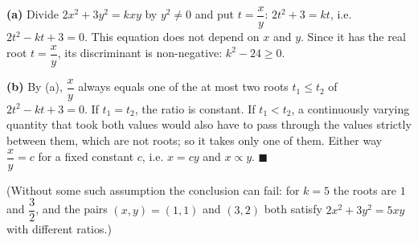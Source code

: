 \textbf{(a)} Divide $2x^2+3y^2=kxy$ by $y^2\ne0$ and put $t=\dfrac xy$: $2t^2+3=kt$, i.e. $2t^2-kt+3=0$. This equation does not depend on $x$ and $y$. Since it has the real root $t=\dfrac xy$, its discriminant is non-negative: $k^2-24\ge0$.

\textbf{(b)} By (a), $\dfrac xy$ always equals one of the at most two roots $t_1\le t_2$ of $2t^2-kt+3=0$. If $t_1=t_2$, the ratio is constant. If $t_1<t_2$, a continuously varying quantity that took both values would also have to pass through the values strictly between them, which are not roots; so it takes only one of them. Either way $\dfrac xy=c$ for a fixed constant $c$, i.e. $x=cy$ and $x\propto y$. $\blacksquare$

(Without some such assumption the conclusion can fail: for $k=5$ the roots are $1$ and $\dfrac32$, and the pairs $(x,y)=(1,1)$ and $(3,2)$ both satisfy $2x^2+3y^2=5xy$ with different ratios.)
